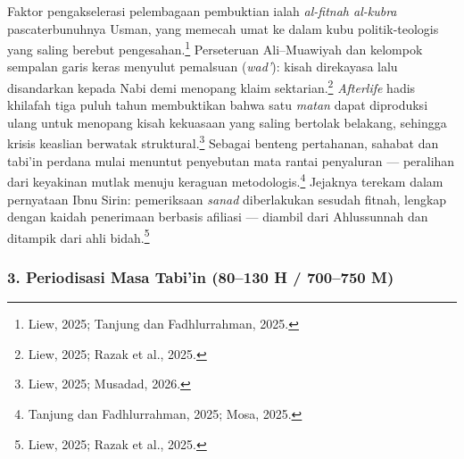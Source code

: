 Faktor pengakselerasi pelembagaan pembuktian ialah \textit{al-fitnah al-kubra} pascaterbunuhnya Usman, yang memecah umat ke dalam kubu politik-teologis yang saling berebut pengesahan.\footnote{Liew, 2025; Tanjung dan Fadhlurrahman, 2025.} Perseteruan Ali--Muawiyah dan kelompok sempalan garis keras menyulut pemalsuan (\textit{wad'}): kisah direkayasa lalu disandarkan kepada Nabi demi menopang klaim sektarian.\footnote{Liew, 2025; Razak et al., 2025.} \textit{Afterlife} hadis khilafah tiga puluh tahun membuktikan bahwa satu \textit{matan} dapat diproduksi ulang untuk menopang kisah kekuasaan yang saling bertolak belakang, sehingga krisis keaslian berwatak struktural.\footnote{Liew, 2025; Musadad, 2026.} Sebagai benteng pertahanan, sahabat dan tabi'in perdana mulai menuntut penyebutan mata rantai penyaluran --- peralihan dari keyakinan mutlak menuju keraguan metodologis.\footnote{Tanjung dan Fadhlurrahman, 2025; Mosa, 2025.} Jejaknya terekam dalam pernyataan Ibnu Sirin: pemeriksaan \textit{sanad} diberlakukan sesudah fitnah, lengkap dengan kaidah penerimaan berbasis afiliasi --- diambil dari Ahlussunnah dan ditampik dari ahli bidah.\footnote{Liew, 2025; Razak et al., 2025.}

\subsubsection*{3. Periodisasi Masa Tabi'in (80--130 H / 700--750 M)}

